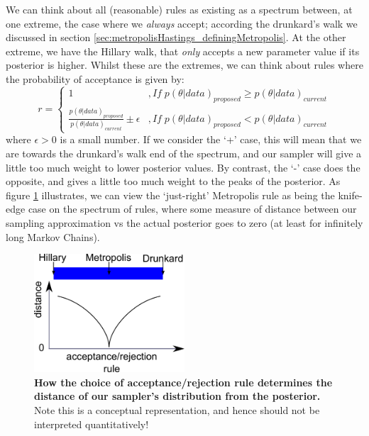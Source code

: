\documentclass[11pt,fullpage]{book}
\begin{document}
We can think about all (reasonable) rules as existing as a spectrum between, at one extreme, the case where we \textit{always} accept; according the drunkard's walk we discussed in section \ref{sec:metropolisHastings_definingMetropolis}. At the other extreme, we have the Hillary walk, that \textit{only} accepts a new parameter value if its posterior is higher. Whilst these are the extremes, we can think about rules where the probability of acceptance is given by:
%
\begin{equation}
r =
\begin{cases}
1 & , If\; p(\theta|data)_{proposed} \geq p(\theta|data)_{current}\\
 \frac{p(\theta|data)_{proposed}}{p(\theta|data)_{current}}\pm \epsilon & , If\; p(\theta|data)_{proposed} < p(\theta|data)_{current}
\end{cases}
\end{equation}
%
where $\epsilon>0$ is a small number. If we consider the `+' case, this will mean that we are towards the drunkard's walk end of the spectrum, and our sampler will give a little too much weight to lower posterior values. By contrast, the `-' case does the opposite, and gives a little too much weight to the peaks of the posterior. As figure \ref{fig:metropolisHastings_knifeEdge} illustrates, we can view the `just-right' Metropolis rule as being the knife-edge case on the spectrum of rules, where some measure of distance between our sampling approximation vs the actual posterior goes to zero (at least for infinitely long Markov Chains).

\begin{figure}
\centerline{\includegraphics[width=0.5\textwidth]{metropolisHastings_knifeEdge.pdf}}
\caption{\textbf{How the choice of acceptance/rejection rule determines the distance of our sampler's distribution from the posterior.} Note this is a conceptual representation, and hence should not be interpreted quantitatively!}\label{fig:metropolisHastings_knifeEdge}
\end{figure}
\end{document}
